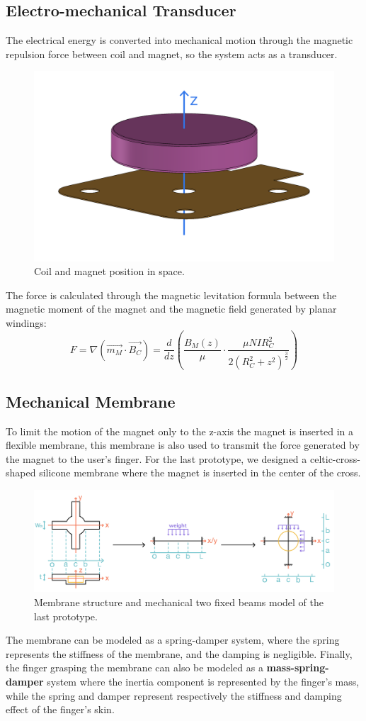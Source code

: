 \subsection{Electro-mechanical Transducer}
The electrical energy is converted into mechanical motion through the magnetic repulsion force between coil and magnet, so the system acts as a transducer.
\begin{figure}[H]
    \centering
    \includegraphics[width=0.4\columnwidth]{Figures/coil_magnet.png} 
    \caption[Coil-Magnet position]{Coil and magnet position in space.}
\end{figure}
The force is calculated through the magnetic levitation formula between the magnetic moment of the magnet and the magnetic field generated by planar windings:
\begin{equation*}
    F = \nabla (\overrightarrow{m_M} \cdot \overrightarrow{B_C}) = \frac{d}{dz} \left( \frac{B_M(z)}{\mu} \cdot \frac{\mu N I R_C^2}{2(R_C^2+z^2)^\frac{3}{2}} \right)
\end{equation*}

\subsection{Mechanical Membrane}
To limit the motion of the magnet only to the z-axis the magnet is inserted in a flexible membrane, this membrane is also used to transmit the force generated by the magnet to the user's finger.
For the last prototype, we designed a celtic-cross-shaped silicone membrane where the magnet is inserted in the center of the cross.
\begin{figure}[H]
    \centering
    \includegraphics[width=0.9\linewidth]{Figures/membr_mech_model.jpg} 
    \caption[Membrane structure]{Membrane structure and mechanical two fixed beams model of the last prototype.}
\end{figure}
The membrane can be modeled as a spring-damper system, where the spring represents the stiffness of the membrane, and the damping is negligible.
Finally, the finger grasping the membrane can also be modeled as a \textbf{mass-spring-damper} system where the inertia component is represented by the finger's mass, while the spring and damper represent respectively the stiffness and damping effect of the finger's skin.
